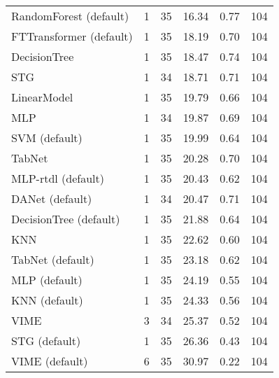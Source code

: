 \begin{tabular}{lrrrrr}
RandomForest (default)  &            1 &  35 &  16.34 &                     0.77 &   104 \\
FTTransformer (default) &            1 &  35 &  18.19 &                     0.70 &   104 \\
DecisionTree            &            1 &  35 &  18.47 &                     0.74 &   104 \\
STG                     &            1 &  34 &  18.71 &                     0.71 &   104 \\
LinearModel             &            1 &  35 &  19.79 &                     0.66 &   104 \\
MLP                     &            1 &  34 &  19.87 &                     0.69 &   104 \\
SVM (default)           &            1 &  35 &  19.99 &                     0.64 &   104 \\
TabNet                  &            1 &  35 &  20.28 &                     0.70 &   104 \\
MLP-rtdl (default)      &            1 &  35 &  20.43 &                     0.62 &   104 \\
DANet (default)         &            1 &  34 &  20.47 &                     0.71 &   104 \\
DecisionTree (default)  &            1 &  35 &  21.88 &                     0.64 &   104 \\
KNN                     &            1 &  35 &  22.62 &                     0.60 &   104 \\
TabNet (default)        &            1 &  35 &  23.18 &                     0.62 &   104 \\
MLP (default)           &            1 &  35 &  24.19 &                     0.55 &   104 \\
KNN (default)           &            1 &  35 &  24.33 &                     0.56 &   104 \\
VIME                    &            3 &  34 &  25.37 &                     0.52 &   104 \\
STG (default)           &            1 &  35 &  26.36 &                     0.43 &   104 \\
VIME (default)          &            6 &  35 &  30.97 &                     0.22 &   104 \\
\bottomrule
\end{tabular}
